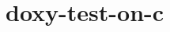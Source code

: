 \chapter{doxy-\/test-\/on-\/c}
\hypertarget{md_README}{}\label{md_README}
\label{md_README_autotoc_md0}%
%
